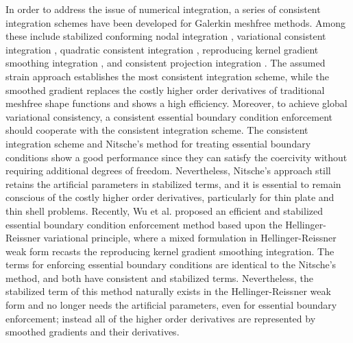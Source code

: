 In order to address the issue of numerical integration, a series of consistent integration schemes have been developed for Galerkin meshfree methods. Among these include stabilized conforming nodal integration \cite{chen2001} , variational consistent integration \cite{chen2013a}, quadratic consistent integration \cite{duan2012a}, reproducing kernel gradient smoothing integration \cite{wang2019a}, and consistent projection integration  \cite{wang2023}. The assumed strain approach establishes the most consistent integration scheme, while the smoothed gradient replaces the costly higher order derivatives of traditional meshfree shape functions and shows a high efficiency. Moreover, to achieve global variational consistency, a consistent essential boundary condition enforcement should cooperate with the consistent integration scheme. The consistent integration scheme and Nitsche’s method for treating essential boundary conditions show a good performance since they can satisfy the coercivity without requiring additional degrees of freedom. Nevertheless, Nitsche's approach still retains the artificial parameters in stabilized terms, and it is essential to remain conscious of the costly higher order derivatives, particularly for thin plate and thin shell problems. Recently, Wu et al. \cite{wu2022a,wu2023}  proposed an efficient and stabilized essential boundary condition enforcement method based upon the Hellinger-Reissner variational principle, where a mixed formulation in Hellinger-Reissner weak form recasts the reproducing kernel gradient smoothing integration. The terms for enforcing essential boundary conditions are identical to the Nitsche’s method, and both have consistent and stabilized terms. Nevertheless, the stabilized term of this method naturally exists in the Hellinger-Reissner weak form and no longer needs the artificial parameters, even for essential boundary enforcement; instead all of the higher order derivatives are represented by smoothed gradients and their derivatives.

